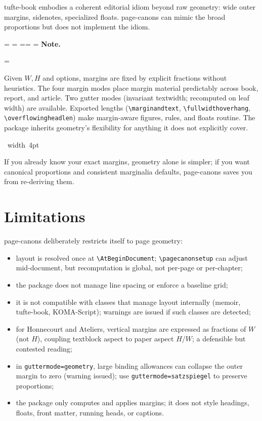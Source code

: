 \documentclass[11pt, twoside, openany]{book}
\makeatletter
\newcommand{\pkg}[1]{\textsf{#1}}
\newcommand{\cmd}[1]{\texttt{\textbackslash #1}}
\newcommand*{\cns@tag@artifact@begin}{}
\newcommand*{\cns@tag@artifact@end}{}
\newenvironment{TodoNote}[1][]{%
  \par\addvspace{0.5\baselineskip plus 2pt}%
  \setbox\cns@box=\vbox\bgroup
    \hsize=\linewidth
    \advance\hsize -10pt
    \linewidth=\hsize \columnwidth=\hsize
    \parindent=\z@
    \noindent\textbf{\sffamily Note\cns@ifnotempty{#1}{ \textmd{(#1)}}.}%
    \par\nobreak
    \@afterindentfalse\@afterheading
    \leftskip=\cns@indent\relax
    \ignorespaces
}{%
  \par
  \egroup
  \vbox{\hbox{%
    \cns@tag@artifact@begin\vrule width 4pt\cns@tag@artifact@end
    \hskip 6pt\relax
    \box\cns@box
  }}%
  \par\addvspace{0.5\baselineskip plus 2pt}%
}
\makeatother
\begin{document}
\pkg{tufte-book} \cite{tufte-latex} embodies a coherent editorial idiom beyond raw geometry: wide outer margins, sidenotes, specialized floats. \pkg{page-canons} can mimic the broad proportions but does not implement the idiom.

\begin{TodoNote}
	Given $W,H$ and options, margins are fixed by explicit fractions without heuristics. The four margin modes place margin material predictably across \pkg{book}, \pkg{report}, and \pkg{article}. Two gutter modes (invariant textwidth; recomputed on leaf width) are available. Exported lengths (\cmd{marginandtext}, \cmd{fullwidthoverhang}, \cmd{overflowingheadlen}) make margin-aware figures, rules, and floats routine. The package inherits \pkg{geometry}'s flexibility for anything it does not explicitly cover.
\end{TodoNote}

If you already know your exact margins, \pkg{geometry} alone is simpler; if you want canonical proportions and consistent marginalia defaults, \pkg{page-canons} saves you from re-deriving them.

\section{Limitations}\label{sec:limits}

\pkg{page-canons} deliberately restricts itself to page geometry:
\begin{itemize}
	\item layout is resolved once at \cmd{AtBeginDocument}; \cmd{pagecanonsetup} can adjust mid-document, but recomputation is global, not per-page or per-chapter;
	\item the package does not manage line spacing or enforce a baseline grid;
	\item it is not compatible with classes that manage layout internally (\pkg{memoir}, \pkg{tufte-book}, KOMA-Script); warnings are issued if such classes are detected;
	\item for Honnecourt and Ateliers, vertical margins are expressed as fractions of $W$ (not $H$), coupling textblock aspect to paper aspect $H/W$; a defensible but contested reading;
	\item in \texttt{guttermode=geometry}, large binding allowances can collapse the outer margin to zero (warning issued); use \texttt{guttermode=satzspiegel} to preserve proportions;
	\item the package only computes and applies margins; it does not style headings, floats, front matter, running heads, or captions.
\end{itemize}
\end{document}

